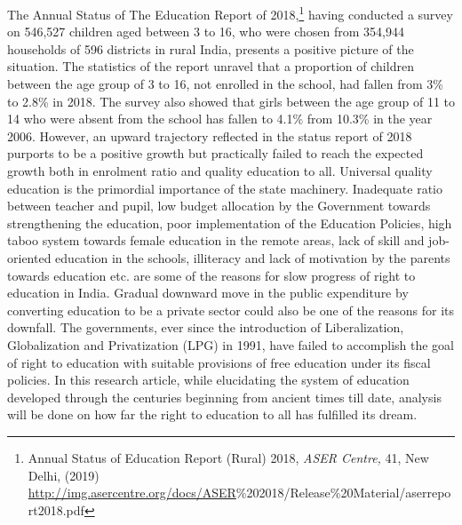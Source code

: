 \setcounter{figure}{0}
\setcounter{table}{0}
\setcounter{footnote}{0}

\label{2019-art2}

\begin{multicols}{2}


\vspace{-.1cm}

\noi
The Annual Status of The Education Report of 2018,\footnote{Annual Status of Education Report (Rural) 2018, \textit{ASER Centre,} 41, New Delhi, (2019)\\ \url{http://img.asercentre.org/docs/ASER}\%202018/Release\%20Material/aserreport2018.pdf} having conducted a survey on 546,527 children aged between 3 to 16, who were chosen from 354,944 households of 596 districts in
rural India, presents a positive picture of the situation. The statistics of the report unravel that
a proportion of children between the age group of 3 to 16, not enrolled in the school, had
fallen from 3\% to 2.8\% in 2018. The survey also showed that girls between the age group of
11 to 14 who were absent from the school has fallen to 4.1\% from 10.3\% in the year 2006.
However, an upward trajectory reflected in the status report of 2018 purports to be a positive
growth but practically failed to reach the expected growth both in enrolment ratio and quality
education to all. Universal quality education is the primordial importance of the state
machinery. Inadequate ratio between teacher and pupil, low budget allocation by the
Government towards strengthening the education, poor implementation of the Education
Policies, high taboo system towards female education in the remote areas, lack of skill and
job-oriented education in the schools, illiteracy and lack of motivation by the parents towards
education etc. are some of the reasons for slow progress of right to education in India.
Gradual downward move in the public expenditure by converting education to be a private
sector could also be one of the reasons for its downfall. The governments, ever since the
introduction of Liberalization, Globalization and Privatization (LPG) in 1991, have failed to
accomplish the goal of right to education with suitable provisions of free education under its
fiscal policies. In this research article, while elucidating the system of education developed
through the centuries beginning from ancient times till date, analysis will be done on how far
the right to education to all has fulfilled its dream.


\end{multicols}

